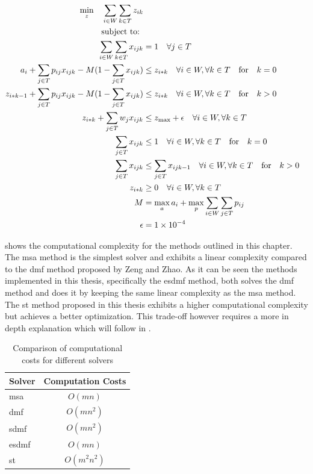 \documentclass{seal_thesis}
\begin{document}
\begin{align}
    \min_z \quad \sum_{i \in W} \sum_{k \in T} z_{ik}\\
    \text{subject to: } \notag \\
    \sum_{i \in W} \sum_{k \in T} x_{ijk} &= 1 \quad \forall j \in T\\
    a_i + \sum_{j \in T} p_{ij} x_{ijk} - M(1 - \sum_{j \in T} x_{ijk}) &\leq z_{i*k} \quad \forall i \in W, \forall k \in T \quad \text{for} \quad k=0\\
    z_{i*k-1} + \sum_{j \in T} p_{ij} x_{ijk} - M(1 - \sum_{j \in T} x_{ijk}) &\leq z_{i*k} \quad \forall i \in W, \forall k \in T \quad \text{for} \quad k>0\\
    z_{i*k}+ \sum_{j \in T} w_j x_{ijk} &\leq z_{\text{max}} + \epsilon \quad \forall i \in W, \forall k \in T\\
    \sum_{j \in T} x_{ijk} &\leq 1 \quad \forall i \in W, \forall k \in T \quad \text{for} \quad k=0\\
    \sum_{j \in T} x_{ijk} &\leq \sum_{j \in T} x_{ijk-1} \quad \forall i \in W, \forall k \in T \quad \text{for} \quad k>0\\
    z_{i*k} &\geq 0 \quad \forall i \in W, \forall k \in T\\
    M &= \max_a a_i + \max_p \sum_{i \in W} \sum_{j \in T} p_{ij}\\
    \epsilon &= \num{1e-4}
\end{align}

 shows the computational complexity for the methods outlined in this chapter. The \gls{msa} method is the simplest solver and exhibits a linear complexity compared to the \gls{dmf} method proposed by Zeng and Zhao. As it can be seen the methods implemented in this thesis, specifically the \gls{esdmf} method, both solves the \gls{dmf} method and does it by keeping the same linear complexity as the \gls{msa} method. The \gls{st} method proposed in this thesis exhibits a higher computational complexity but achieves a better optimization. This trade-off however requires a more in depth explanation which will follow in .

\begin{table}[!ht]
\centering
\begin{tabular}{@{}lc@{}}
\toprule
Solver & Computation Costs \\ \midrule
\gls{msa}    & $O(mn)$           \\
\gls{dmf}   & $O(mn^2)$         \\
\gls{sdmf}  & $O(mn^2)$         \\
\gls{esdmf}  & $O(mn)$           \\
\gls{st} 	   & $O(m^2n^2)$ \\	\bottomrule
\end{tabular}
\caption{Comparison of computational costs for different solvers}
\label{tab:big_oh_solvers}
\end{table}
\end{document}
